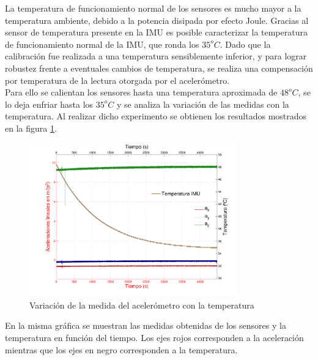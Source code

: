 \documentclass[main]{subfiles}
\begin{document}
La temperatura de funcionamiento normal de los sensores es mucho mayor a la temperatura ambiente, debido a la potencia disipada por efecto Joule. Gracias al sensor de temperatura presente en la IMU es posible caracterizar la temperatura de funcionamiento normal de la IMU, que ronda los $35^oC$. Dado que la calibración fue realizada a una temperatura sensiblemente inferior, y para lograr robustez frente a eventuales cambios de temperatura, se realiza una compensación por temperatura de la lectura otorgada por el acelerómetro.\\

Para ello se calientan los sensores hasta una temperatura aproximada de $48^oC$, se lo deja enfriar hasta los $35^oC$ y se analiza la variación de las medidas con la temperatura. Al realizar dicho experimento se obtienen los resultados mostrados en la figura \ref{fig:bajada}.

\begin{figure}[H]
  \begin{center}
    \includegraphics[width=0.8\textwidth]{./pics_acc/bajada.pdf}
  \end{center}
  \vspace{-20pt}
  \caption{Variación de la medida del acelerómetro con la temperatura }
  \label{fig:bajada}
\end{figure}

En la misma gráfica se muestran las medidas obtenidas de los sensores y la temperatura en función del tiempo. Los ejes rojos corresponden a la aceleración mientras que los ejes en negro corresponden a la temperatura.\\
\end{document}
